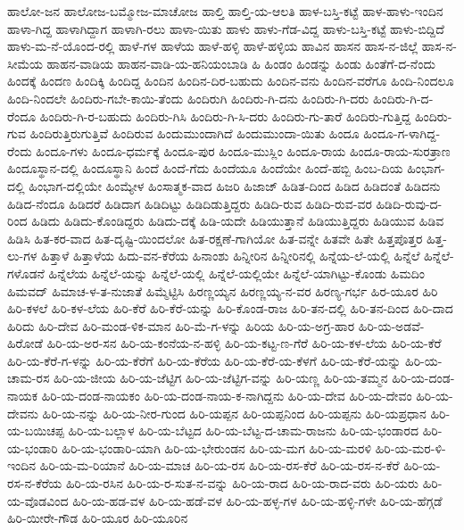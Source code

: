 ಹಾಲೋ-ಜನ
ಹಾಲೋಜ-ಬಮ್ಮೋಜ-ಮಾಚೋಜ
ಹಾಲ್ತಿ
ಹಾಲ್ತಿ-ಯ-ಆಲತಿ
ಹಾಳ-ಬಸ್ತಿ-ಕಟ್ಟೆ
ಹಾಳ-ಹಾಳು-ಇಂದಿನ
ಹಾಳಾ-ಗಿದ್ದ
ಹಾಳಾಗಿದ್ದಾಗ
ಹಾಳಾಗಿ-ರಲು
ಹಾಳಾ-ಯಿತು
ಹಾಳು
ಹಾಳು-ಗೆಡ-ವಿದ್ದ
ಹಾಳು-ಬಸ್ತಿ-ಕಟ್ಟೆ
ಹಾಳು-ಬಿದ್ದಿದೆ
ಹಾಳು-ಮ-ನೆ-ಯೊಂದ-ರಲ್ಲಿ
ಹಾಳೆ-ಗಳ
ಹಾಳೆಯ
ಹಾಳೆ-ಹಳ್ಳಿ
ಹಾಳೆ-ಹಳ್ಳಿಯ
ಹಾವಿನ
ಹಾಸನ
ಹಾಸ-ನ-ಜಿಲ್ಲೆ
ಹಾಸ-ನ-ಸೀಮೆಯ
ಹಾಹನ-ವಾಡಿಯ
ಹಾಹನ-ವಾಡಿ-ಯ-ಹನಿಯಂಬಾಡಿ
ಹಿ
ಹಿಂಡಂ
ಹಿಂಡನ್ನು
ಹಿಂಡು
ಹಿಂತೆಗೆ-ದ-ನೆಂದು
ಹಿಂದಕ್ಕೆ
ಹಿಂದಣ
ಹಿಂದಿಕ್ಕಿ
ಹಿಂದಿದ್ದ
ಹಿಂದಿನ
ಹಿಂದಿನ-ದಿರ-ಬಹುದು
ಹಿಂದಿನ-ವನು
ಹಿಂದಿನ-ವರೆಗೂ
ಹಿಂದಿ-ನಿಂದಲೂ
ಹಿಂದಿ-ನಿಂದಲೇ
ಹಿಂದಿರು-ಗಬೇ-ಕಾಯಿ-ತೆಂದು
ಹಿಂದಿರುಗಿ
ಹಿಂದಿರು-ಗಿ-ದನು
ಹಿಂದಿರು-ಗಿ-ದರು
ಹಿಂದಿರು-ಗಿ-ದ-ರೆಂದೂ
ಹಿಂದಿರು-ಗಿ-ರ-ಬಹುದು
ಹಿಂದಿರು-ಗಿಸಿ
ಹಿಂದಿರು-ಗಿ-ಸಿ-ದರು
ಹಿಂದಿರು-ಗು-ತಾರೆ
ಹಿಂದಿರು-ಗುತ್ತಿದ್ದ
ಹಿಂದಿರು-ಗುವ
ಹಿಂದಿರುತ್ತಿರುಗುತ್ತಿವೆ
ಹಿಂದಿರುವ
ಹಿಂದುಮುಂದಾಗಿದೆ
ಹಿಂದುಮುಂದಾ-ಯಿತು
ಹಿಂದೂ
ಹಿಂದೂ-ಗ-ಳಾಗಿದ್ದ-ರೆಂದು
ಹಿಂದೂ-ಗಳು
ಹಿಂದೂ-ಧರ್ಮಕ್ಕೆ
ಹಿಂದೂ-ಪುರ
ಹಿಂದೂ-ಮುಸ್ಲಿಂ
ಹಿಂದೂ-ರಾಯ
ಹಿಂದೂ-ರಾಯ-ಸುರತ್ರಾಣ
ಹಿಂದೂಸ್ಥಾನ-ದಲ್ಲಿ
ಹಿಂದೂಸ್ಥಾನಿ
ಹಿಂದೆ
ಹಿಂದೆ-ಗೆದು
ಹಿಂದೆಯೂ
ಹಿಂದೆಯೇ
ಹಿಂದೆ-ಹಬ್ಬಿ
ಹಿಂಬ-ದಿಯ
ಹಿಂಭಾಗ-ದಲ್ಲಿ
ಹಿಂಭಾಗ-ದಲ್ಲಿಯೇ
ಹಿಂಮ್ಯೇಳ
ಹಿಂಸಾತ್ಮಕ-ವಾದ
ಹಿಜರಿ
ಹಿಜಾಜ್
ಹಿಡಿತ-ದಿಂದ
ಹಿಡಿದ
ಹಿಡಿದಂತೆ
ಹಿಡಿದನು
ಹಿಡಿದ-ನೆಂದೂ
ಹಿಡಿದರೆ
ಹಿಡಿದಾಗ
ಹಿಡಿದಿಟ್ಟು
ಹಿಡಿದಿಡುತ್ತಿದ್ದರು
ಹಿಡಿದಿ-ರುವ
ಹಿಡಿದಿ-ರುವ-ವರ
ಹಿಡಿದಿ-ರುವು-ದ-ರಿಂದ
ಹಿಡಿದು
ಹಿಡಿದು-ಕೊಂಡಿದ್ದರು
ಹಿಡಿದು-ದಕ್ಕೆ
ಹಿಡಿ-ಯದೇ
ಹಿಡಿಯುತ್ತಾನೆ
ಹಿಡಿಯುತ್ತಿದ್ದರು
ಹಿಡಿಯುವ
ಹಿಡಿವ
ಹಿಡಿಸಿ
ಹಿತ-ಕರ-ವಾದ
ಹಿತ-ದೃಷ್ಟಿ-ಯಿಂದಲೋ
ಹಿತ-ರಕ್ಷಣೆ-ಗಾಗಿಯೋ
ಹಿತ-ವನ್ನೇ
ಹಿತವೇ
ಹಿತೇ
ಹಿತ್ತಪೊತ್ತರ
ಹಿತ್ತ-ಲು-ಗಳ
ಹಿತ್ತಾಳೆ
ಹಿತ್ತಾಳೆಯ
ಹಿದು-ವನ-ಕೆರೆಯ
ಹಿನಾಂಶು
ಹಿನ್ನೀರಿನ
ಹಿನ್ನೀರಿನಲ್ಲಿ
ಹಿನ್ನೆಯ-ಲೆ-ಯಲ್ಲಿ
ಹಿನ್ನೆಲೆ
ಹಿನ್ನೆಲೆ-ಗಳೊಡನೆ
ಹಿನ್ನೆಲೆಯ
ಹಿನ್ನೆಲೆ-ಯನ್ನು
ಹಿನ್ನೆಲೆ-ಯಲ್ಲಿ
ಹಿನ್ನೆಲೆ-ಯಲ್ಲಿಯೇ
ಹಿನ್ನೆಲೆ-ಯಾಗಿಟ್ಟು-ಕೊಂಡು
ಹಿಮದಿಂ
ಹಿಮವದ್
ಹಿಮಾಚ-ಳ-ತ-ನುಜಾತೆ
ಹಿಮ್ಮೆಟ್ಟಿಸಿ
ಹಿರಣ್ಣಯ್ಯನ
ಹಿರಣ್ಣಯ್ಯ-ನ-ವರ
ಹಿರಣ್ಯ-ಗರ್ಭ
ಹಿರ-ಯೂರ
ಹಿರಿ
ಹಿರಿ-ಕಳಲೆ
ಹಿರಿ-ಕಳ-ಲೆಯ
ಹಿರಿ-ಕೆರೆ
ಹಿರಿ-ಕೆರೆ-ಯನ್ನು
ಹಿರಿ-ಕೊಂಡ-ರಾಜ
ಹಿರಿ-ತನ-ದಲ್ಲಿ
ಹಿರಿ-ತನ-ದಿಂದ
ಹಿರಿ-ದಾದ
ಹಿರಿದು
ಹಿರಿ-ದೇವ
ಹಿರಿ-ಮಂಡ-ಳಿಕ-ಮಾನ
ಹಿರಿ-ಮೆ-ಗ-ಳನ್ನು
ಹಿರಿಯ
ಹಿರಿ-ಯ-ಅಗ್ರ-ಹಾರ
ಹಿರಿ-ಯ-ಅಡವೆ-ಹಿರೋಡೆ
ಹಿರಿ-ಯ-ಅರ-ಸನ
ಹಿರಿ-ಯ-ಕಂನೆಯ-ನ-ಹಳ್ಳಿ
ಹಿರಿ-ಯ-ಕಟ್ಟ-ಣ-ಗೆರೆ
ಹಿರಿ-ಯ-ಕಳ-ಲೆಯ
ಹಿರಿ-ಯ-ಕೆರೆ
ಹಿರಿ-ಯ-ಕೆರೆ-ಗ-ಳನ್ನು
ಹಿರಿ-ಯ-ಕೆರೆಗೆ
ಹಿರಿ-ಯ-ಕೆರೆಯ
ಹಿರಿ-ಯ-ಕೆರೆ-ಯ-ಕೆಳಗೆ
ಹಿರಿ-ಯ-ಕೆರೆ-ಯನ್ನು
ಹಿರಿ-ಯ-ಚಾಮ-ರಸ
ಹಿರಿ-ಯ-ಜೀಯ
ಹಿರಿ-ಯ-ಜೆಟ್ಟಿಗ
ಹಿರಿ-ಯ-ಜೆಟ್ಟಿಗ-ವನ್ನು
ಹಿರಿ-ಯಣ್ಣ
ಹಿರಿ-ಯ-ತಮ್ಮನ
ಹಿರಿ-ಯ-ದಂಡ-ನಾಯಕ
ಹಿರಿ-ಯ-ದಂಡ-ನಾಯಕಂ
ಹಿರಿ-ಯ-ದಂಡ-ನಾಯ-ಕ-ನಾಗಿದ್ದನು
ಹಿರಿ-ಯ-ದೇವ
ಹಿರಿ-ಯ-ದೇವಂ
ಹಿರಿ-ಯ-ದೇವನು
ಹಿರಿ-ಯ-ನನ್ನು
ಹಿರಿ-ಯ-ನೀರ-ಗುಂದ
ಹಿರಿ-ಯಪ್ಪನ
ಹಿರಿ-ಯಪ್ಪನಿಂದ
ಹಿರಿ-ಯಪ್ಪನು
ಹಿರಿ-ಯಪ್ರಧಾನ
ಹಿರಿ-ಯ-ಬಯಿಚಪ್ಪ
ಹಿರಿ-ಯ-ಬಲ್ಲಾಳ
ಹಿರಿ-ಯ-ಬೆಟ್ಟದ
ಹಿರಿ-ಯ-ಬೆಟ್ಟ-ದ-ಚಾಮ-ರಾಜನು
ಹಿರಿ-ಯ-ಭಂಡಾರದ
ಹಿರಿ-ಯ-ಭಂಡಾರಿ
ಹಿರಿ-ಯ-ಭಂಡಾರಿ-ಯಾಗಿ
ಹಿರಿ-ಯ-ಭೇರುಂಡನ
ಹಿರಿ-ಯ-ಮಗ
ಹಿರಿ-ಯ-ಮರಳಿ
ಹಿರಿ-ಯ-ಮರ-ಳಿ-ಇಂದಿನ
ಹಿರಿ-ಯ-ಮ-ರಿಯಾನೆ
ಹಿರಿ-ಯ-ಮಾಚ
ಹಿರಿ-ಯ-ರಸ
ಹಿರಿ-ಯ-ರಸ-ಕೆರೆ
ಹಿರಿ-ಯ-ರಸ-ನ-ಕೆರೆ
ಹಿರಿ-ಯ-ರಸ-ನ-ಕೆರೆಯ
ಹಿರಿ-ಯ-ರಸಿನ
ಹಿರಿ-ಯ-ರ-ಸುತ-ನ-ವನ್ನು
ಹಿರಿ-ಯ-ರಾದ
ಹಿರಿ-ಯ-ರಾದ-ವರು
ಹಿರಿ-ಯರು
ಹಿರಿ-ಯ-ವೊಡವಿಂದ
ಹಿರಿ-ಯ-ಹಡ-ವಳ
ಹಿರಿ-ಯ-ಹಡೆ-ವಳ
ಹಿರಿ-ಯ-ಹಳ್ಳ-ಗಳ
ಹಿರಿ-ಯ-ಹಳ್ಳಿ-ಗಳೇ
ಹಿರಿ-ಯ-ಹೆಗ್ಗಡೆ
ಹಿರಿ-ಯೀರೇ-ಗೌಡ
ಹಿರಿ-ಯೂರ
ಹಿರಿ-ಯೂರಿನ
